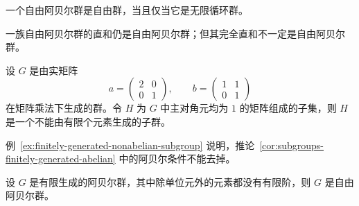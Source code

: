 \begin{purplenote}
\end{purplenote}

\begin{proposition}\label{prop:free-abelian-also-free-group}
一个自由阿贝尔群是自由群，当且仅当它是无限循环群。
\end{proposition}

\begin{proposition}\label{prop:direct-sum-free-abelian}
一族自由阿贝尔群的直和仍是自由阿贝尔群；但其完全直和不一定是自由阿贝尔群。
\end{proposition}

\begin{example}\label{ex:finitely-generated-nonabelian-subgroup}
设 $G$ 是由实矩阵
\[
  a=\begin{pmatrix}2&0\\0&1\end{pmatrix},
  \qquad
  b=\begin{pmatrix}1&1\\0&1\end{pmatrix}
\]
在矩阵乘法下生成的群。令 $H$ 为 $G$ 中主对角元均为 $1$ 的矩阵组成的子集，则 $H$ 是一个不能由有限个元素生成的子群。
\end{example}

\begin{purplenote}
例~\ref{ex:finitely-generated-nonabelian-subgroup} 说明，推论~\ref{cor:subgroups-finitely-generated-abelian} 中的阿贝尔条件不能去掉。
\end{purplenote}

\begin{proposition}\label{prop:finitely-generated-torsion-free-abelian}
设 $G$ 是有限生成的阿贝尔群，其中除单位元外的元素都没有有限阶，则 $G$ 是自由阿贝尔群。
\end{proposition}

